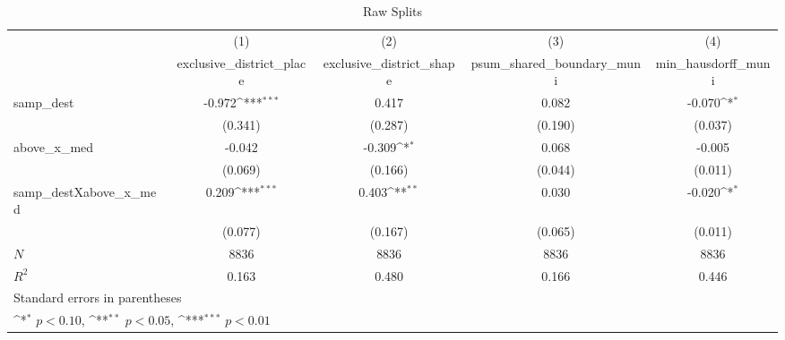 \begin{table}[htbp]\centering
\def\sym#1{\ifmmode^{#1}\else\(^{#1}\)\fi}
\caption{Raw Splits}
\begin{tabular}{l*{4}{c}}
\hline\hline
            &\multicolumn{1}{c}{(1)}&\multicolumn{1}{c}{(2)}&\multicolumn{1}{c}{(3)}&\multicolumn{1}{c}{(4)}\\
            &\multicolumn{1}{c}{exclusive\_district\_place}&\multicolumn{1}{c}{exclusive\_district\_shape}&\multicolumn{1}{c}{psum\_shared\_boundary\_muni}&\multicolumn{1}{c}{min\_hausdorff\_muni}\\
\hline
samp\_dest   &      -0.972\sym{***}&       0.417         &       0.082         &      -0.070\sym{*}  \\
            &     (0.341)         &     (0.287)         &     (0.190)         &     (0.037)         \\
[1em]
above\_x\_med &      -0.042         &      -0.309\sym{*}  &       0.068         &      -0.005         \\
            &     (0.069)         &     (0.166)         &     (0.044)         &     (0.011)         \\
[1em]
samp\_destXabove\_x\_med&       0.209\sym{***}&       0.403\sym{**} &       0.030         &      -0.020\sym{*}  \\
            &     (0.077)         &     (0.167)         &     (0.065)         &     (0.011)         \\
\hline
\(N\)       &        8836         &        8836         &        8836         &        8836         \\
\(R^{2}\)   &       0.163         &       0.480         &       0.166         &       0.446         \\
\hline\hline
\multicolumn{5}{l}{\footnotesize Standard errors in parentheses}\\
\multicolumn{5}{l}{\footnotesize \sym{*} \(p<0.10\), \sym{**} \(p<0.05\), \sym{***} \(p<0.01\)}\\
\end{tabular}
\end{table}
